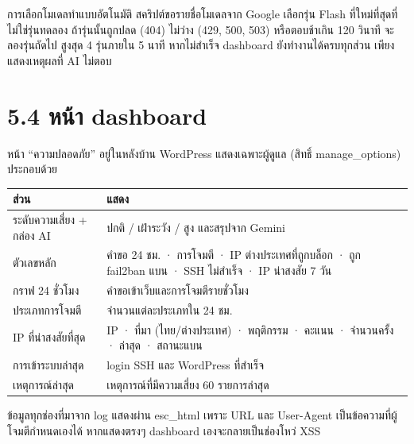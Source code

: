 การเลือกโมเดลทำแบบอัตโนมัติ สคริปต์ขอรายชื่อโมเดลจาก Google เลือกรุ่น Flash ที่ใหม่ที่สุดที่ไม่ใช่รุ่นทดลอง ถ้ารุ่นนั้นถูกปลด (404) ไม่ว่าง (429, 500, 503) หรือตอบช้าเกิน 120 วินาที จะลองรุ่นถัดไป สูงสุด 4 รุ่นภายใน 5 นาที หากไม่สำเร็จ dashboard ยังทำงานได้ครบทุกส่วน เพียงแสดงเหตุผลที่ AI ไม่ตอบ

\section*{5.4 หน้า dashboard}

หน้า ``ความปลอดภัย'' อยู่ในหลังบ้าน WordPress แสดงเฉพาะผู้ดูแล (สิทธิ์ manage\_options) ประกอบด้วย

\begingroup\small\begin{longtable}[]{@{}>{\raggedright\arraybackslash}p{}>{\raggedright\arraybackslash}p{}@{}}
\toprule\noalign{}
ส่วน & แสดง \\
\midrule\noalign{}
\endhead
\bottomrule\noalign{}
\endlastfoot
ระดับความเสี่ยง + กล่อง AI & ปกติ / เฝ้าระวัง / สูง และสรุปจาก Gemini \\
ตัวเลขหลัก & คำขอ 24 ชม. · การโจมตี · IP ต่างประเทศที่ถูกบล็อก · ถูก fail2ban แบน · SSH ไม่สำเร็จ · IP น่าสงสัย 7 วัน \\
กราฟ 24 ชั่วโมง & คำขอเข้าเว็บและการโจมตีรายชั่วโมง \\
ประเภทการโจมตี & จำนวนแต่ละประเภทใน 24 ชม. \\
IP ที่น่าสงสัยที่สุด & IP · ที่มา (ไทย/ต่างประเทศ) · พฤติกรรม · คะแนน · จำนวนครั้ง · ล่าสุด · สถานะแบน \\
การเข้าระบบล่าสุด & login SSH และ WordPress ที่สำเร็จ \\
เหตุการณ์ล่าสุด & เหตุการณ์ที่มีความเสี่ยง 60 รายการล่าสุด \\
\end{longtable}\endgroup

ข้อมูลทุกช่องที่มาจาก log แสดงผ่าน esc\_html เพราะ URL และ User-Agent เป็นข้อความที่ผู้โจมตีกำหนดเองได้ หากแสดงตรงๆ dashboard เองจะกลายเป็นช่องโหว่ XSS
